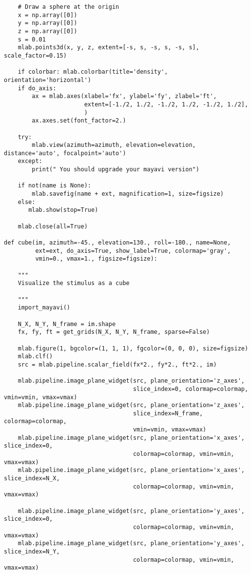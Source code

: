 \documentclass[a4paper,11pt]{article}%
\begin{document}
\begin{lstlisting}
    # Draw a sphere at the origin
    x = np.array([0])
    y = np.array([0])
    z = np.array([0])
    s = 0.01
    mlab.points3d(x, y, z, extent=[-s, s, -s, s, -s, s], scale_factor=0.15)

    if colorbar: mlab.colorbar(title='density', orientation='horizontal')
    if do_axis:
        ax = mlab.axes(xlabel='fx', ylabel='fy', zlabel='ft',
                       extent=[-1./2, 1./2, -1./2, 1./2, -1./2, 1./2],
                       )
        ax.axes.set(font_factor=2.)

    try:
        mlab.view(azimuth=azimuth, elevation=elevation, distance='auto', focalpoint='auto')
    except:
        print(" You should upgrade your mayavi version")

    if not(name is None):
        mlab.savefig(name + ext, magnification=1, size=figsize)
    else:
       mlab.show(stop=True)

    mlab.close(all=True)

def cube(im, azimuth=-45., elevation=130., roll=-180., name=None,
         ext=ext, do_axis=True, show_label=True, colormap='gray',
         vmin=0., vmax=1., figsize=figsize):

    """
    Visualize the stimulus as a cube
    
    """
    import_mayavi()

    N_X, N_Y, N_frame = im.shape
    fx, fy, ft = get_grids(N_X, N_Y, N_frame, sparse=False)

    mlab.figure(1, bgcolor=(1, 1, 1), fgcolor=(0, 0, 0), size=figsize)
    mlab.clf()
    src = mlab.pipeline.scalar_field(fx*2., fy*2., ft*2., im)

    mlab.pipeline.image_plane_widget(src, plane_orientation='z_axes',
                                     slice_index=0, colormap=colormap, vmin=vmin, vmax=vmax)
    mlab.pipeline.image_plane_widget(src, plane_orientation='z_axes',
                                     slice_index=N_frame, colormap=colormap,
                                     vmin=vmin, vmax=vmax)
    mlab.pipeline.image_plane_widget(src, plane_orientation='x_axes', slice_index=0,
                                     colormap=colormap, vmin=vmin, vmax=vmax)
    mlab.pipeline.image_plane_widget(src, plane_orientation='x_axes', slice_index=N_X,
                                     colormap=colormap, vmin=vmin, vmax=vmax)

    mlab.pipeline.image_plane_widget(src, plane_orientation='y_axes', slice_index=0,
                                     colormap=colormap, vmin=vmin, vmax=vmax)
    mlab.pipeline.image_plane_widget(src, plane_orientation='y_axes', slice_index=N_Y,
                                     colormap=colormap, vmin=vmin, vmax=vmax)


\end{lstlisting}
\end{document}
